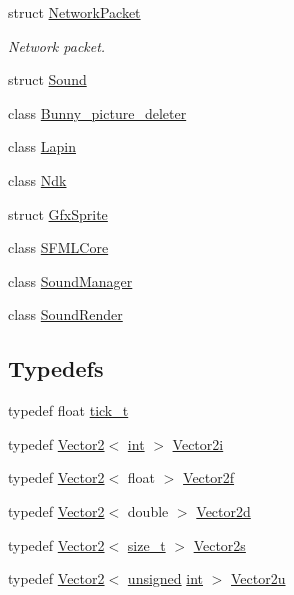 \begin{DoxyCompactItemize}
struct \hyperlink{structarcade_1_1_network_packet}{Network\-Packet}
\begin{DoxyCompactList}\small\item\em Network packet. \end{DoxyCompactList}\item 
struct \hyperlink{structarcade_1_1_sound}{Sound}
\item 
class \hyperlink{classarcade_1_1_bunny__picture__deleter}{Bunny\-\_\-picture\-\_\-deleter}
\item 
class \hyperlink{classarcade_1_1_lapin}{Lapin}
\item 
class \hyperlink{classarcade_1_1_ndk}{Ndk}
\item 
struct \hyperlink{structarcade_1_1_gfx_sprite}{Gfx\-Sprite}
\item 
class \hyperlink{classarcade_1_1_s_f_m_l_core}{S\-F\-M\-L\-Core}
\item 
class \hyperlink{classarcade_1_1_sound_manager}{Sound\-Manager}
\item 
class \hyperlink{classarcade_1_1_sound_render}{Sound\-Render}
\end{DoxyCompactItemize}
\subsection*{Typedefs}
\begin{DoxyCompactItemize}
\item 
typedef float \hyperlink{namespacearcade_a0310f1a25932c12488a64333351f88f6}{tick\-\_\-t}
\item 
typedef \hyperlink{structarcade_1_1_vector2}{Vector2}$<$ \hyperlink{term__entry_8h_ad65b480f8c8270356b45a9890f6499ae}{int} $>$ \hyperlink{namespacearcade_aaa528de7dfbe798ae3ad369c9c464f51}{Vector2i}
\item 
typedef \hyperlink{structarcade_1_1_vector2}{Vector2}$<$ float $>$ \hyperlink{namespacearcade_a669065a59d7a67f9f522994ba1330c9d}{Vector2f}
\item 
typedef \hyperlink{structarcade_1_1_vector2}{Vector2}$<$ double $>$ \hyperlink{namespacearcade_ad7fa150bb74a2e66cb4fa04d6fb79e97}{Vector2d}
\item 
typedef \hyperlink{structarcade_1_1_vector2}{Vector2}$<$ \hyperlink{nc__alloc_8h_a7b60c5629e55e8ec87a4547dd4abced4}{size\-\_\-t} $>$ \hyperlink{namespacearcade_a8e527f7400fbff9c38dc31e0a3dd06a1}{Vector2s}
\item 
typedef \hyperlink{structarcade_1_1_vector2}{Vector2}$<$ \hyperlink{curses_8priv_8h_aca40206900cfc164654362fa8d4ad1e6}{unsigned} \hyperlink{term__entry_8h_ad65b480f8c8270356b45a9890f6499ae}{int} $>$ \hyperlink{namespacearcade_a653661492cf890c245ae977241177880}{Vector2u}
\end{DoxyCompactItemize}

